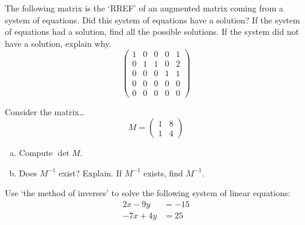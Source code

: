 \documentclass[11pt,letterpaper]{article}
\begin{document}

 The following matrix is the `RREF' of an augmented matrix coming from a system of equations. Did this system of equations have a solution? If the system of equations had a solution, find all the possible solutions. If the system did not have a solution, explain why. 
	\[
	\begin{pmatrix}
	1 & 0 & 0 & 0 & 1 \\
	0 & 1 & 1 & 0 & 2 \\
	0 & 0 & 0 & 1 & 1 \\
	0 & 0 & 0 & 0 & 0 \\
	0 & 0 & 0 & 0 & 0 
	\end{pmatrix}
	\] 



\newpage



 Consider the matrix\dots
	\[
	M= \begin{pmatrix} 1 & 8 \\ 1 & 4 \end{pmatrix}
	\] 

\begin{enumerate}[(a)]
\item Compute $\det M$. 
\item Does $M^{-1}$ exist? Explain. If $M^{-1}$ exists, find $M^{-1}$. 
\end{enumerate}



\newpage



 Use `the method of inverses' to solve the following system of linear equations:
	\[
	\begin{aligned}
	2x - 9y&= -15 \\
	-7x + 4y&= 25
	\end{aligned}
	\]
\end{document}
